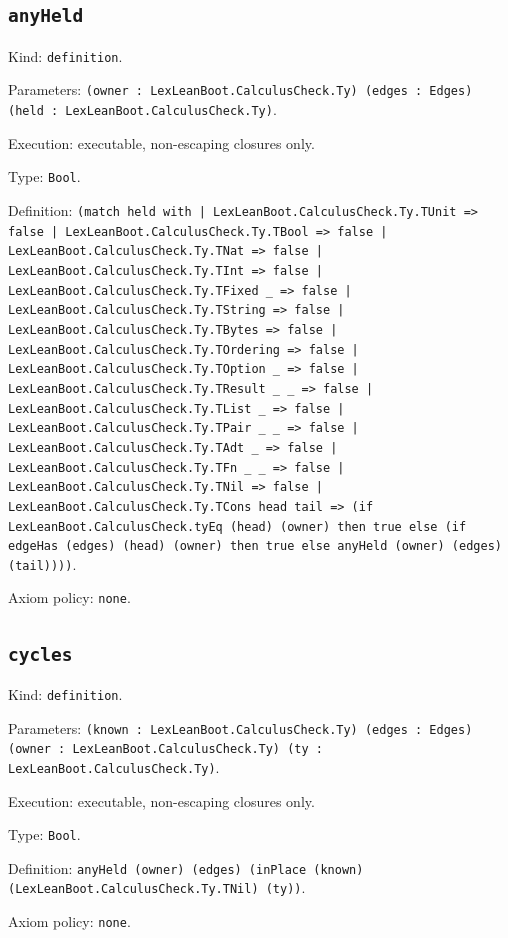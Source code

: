 \documentclass[11pt]{article}
\begin{document}
\subsection*{\texttt{anyHeld}}
\noindent Kind: \texttt{definition}.\par
\noindent Parameters: \texttt{(owner : LexLeanBoot.CalculusCheck.Ty) (edges : Edges) (held : LexLeanBoot.CalculusCheck.Ty)}.\par
\noindent Execution: executable, non-escaping closures only.\par
\noindent Type: \texttt{Bool}.\par
\noindent Definition: \texttt{(match held with | LexLeanBoot.CalculusCheck.Ty.TUnit => false | LexLeanBoot.CalculusCheck.Ty.TBool => false | LexLeanBoot.CalculusCheck.Ty.TNat => false | LexLeanBoot.CalculusCheck.Ty.TInt => false | LexLeanBoot.CalculusCheck.Ty.TFixed \_ => false | LexLeanBoot.CalculusCheck.Ty.TString => false | LexLeanBoot.CalculusCheck.Ty.TBytes => false | LexLeanBoot.CalculusCheck.Ty.TOrdering => false | LexLeanBoot.CalculusCheck.Ty.TOption \_ => false | LexLeanBoot.CalculusCheck.Ty.TResult \_ \_ => false | LexLeanBoot.CalculusCheck.Ty.TList \_ => false | LexLeanBoot.CalculusCheck.Ty.TPair \_ \_ => false | LexLeanBoot.CalculusCheck.Ty.TAdt \_ => false | LexLeanBoot.CalculusCheck.Ty.TFn \_ \_ => false | LexLeanBoot.CalculusCheck.Ty.TNil => false | LexLeanBoot.CalculusCheck.Ty.TCons head tail => (if LexLeanBoot.CalculusCheck.tyEq (head) (owner) then true else (if edgeHas (edges) (head) (owner) then true else anyHeld (owner) (edges) (tail))))}.\par
\noindent Axiom policy: \texttt{none}.\par
\subsection*{\texttt{cycles}}
\noindent Kind: \texttt{definition}.\par
\noindent Parameters: \texttt{(known : LexLeanBoot.CalculusCheck.Ty) (edges : Edges) (owner : LexLeanBoot.CalculusCheck.Ty) (ty : LexLeanBoot.CalculusCheck.Ty)}.\par
\noindent Execution: executable, non-escaping closures only.\par
\noindent Type: \texttt{Bool}.\par
\noindent Definition: \texttt{anyHeld (owner) (edges) (inPlace (known) (LexLeanBoot.CalculusCheck.Ty.TNil) (ty))}.\par
\noindent Axiom policy: \texttt{none}.\par
\end{document}
